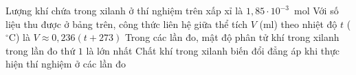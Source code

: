 \begin{ex}
\begin{minipage}[c]{0.58\linewidth}
\begin{tabular}{|c|>{\centering\arraybackslash}m{3.5cm}|>{\centering\arraybackslash}m{3.5cm}|}
				\hline
			\end{tabular}
		\end{minipage}
		\choiceTFt
		{Lượng khí chứa trong xilanh ở thí nghiệm trên xấp xỉ là $1{,}85\cdot 10^{-3}$~mol}
		{\True Với số liệu thu được ở bảng trên, công thức liên hệ giữa thể tích $V$ (ml) theo nhiệt độ $t$ ($^\circ$C) là $V\approx 0{,}236(t+273)$}
		{Trong các lần đo, mật độ phân tử khí trong xilanh trong lần đo thứ $1$ là lớn nhất}
		{\True Chất khí trong xilanh biến đổi đẳng áp khi thực hiện thí nghiệm ở các lần đo}
	\end{ex}

